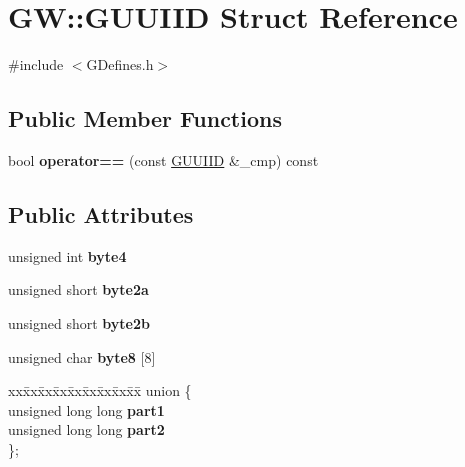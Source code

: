 \hypertarget{struct_g_w_1_1_g_u_u_i_i_d}{}\section{GW\+:\+:G\+U\+U\+I\+ID Struct Reference}
\label{struct_g_w_1_1_g_u_u_i_i_d}


{\ttfamily \#include $<$G\+Defines.\+h$>$}

\subsection*{Public Member Functions}
\begin{DoxyCompactItemize}
\item 
\hypertarget{struct_g_w_1_1_g_u_u_i_i_d_a91cfd5559e56d01dd58d0d60f1704bd6}{}\label{struct_g_w_1_1_g_u_u_i_i_d_a91cfd5559e56d01dd58d0d60f1704bd6} 
bool {\bfseries operator==} (const \hyperlink{struct_g_w_1_1_g_u_u_i_i_d}{G\+U\+U\+I\+ID} \&\+\_\+cmp) const
\end{DoxyCompactItemize}
\subsection*{Public Attributes}
\begin{DoxyCompactItemize}
\item 
\hypertarget{struct_g_w_1_1_g_u_u_i_i_d_a017e04c2cb5c5bab165bf4ec0fa3ca55}{}\label{struct_g_w_1_1_g_u_u_i_i_d_a017e04c2cb5c5bab165bf4ec0fa3ca55} 
unsigned int {\bfseries byte4}
\item 
\hypertarget{struct_g_w_1_1_g_u_u_i_i_d_a57b18450de3bffef5a6e39d9dcb6b68f}{}\label{struct_g_w_1_1_g_u_u_i_i_d_a57b18450de3bffef5a6e39d9dcb6b68f} 
unsigned short {\bfseries byte2a}
\item 
\hypertarget{struct_g_w_1_1_g_u_u_i_i_d_ab5045e59e0d3aa82a27208a063b9cbb6}{}\label{struct_g_w_1_1_g_u_u_i_i_d_ab5045e59e0d3aa82a27208a063b9cbb6} 
unsigned short {\bfseries byte2b}
\item 
\hypertarget{struct_g_w_1_1_g_u_u_i_i_d_a631f2e8efb3ddd9794c068e0b9000cce}{}\label{struct_g_w_1_1_g_u_u_i_i_d_a631f2e8efb3ddd9794c068e0b9000cce} 
unsigned char {\bfseries byte8} \mbox{[}8\mbox{]}
\item 
\hypertarget{struct_g_w_1_1_g_u_u_i_i_d_aa51f004bf72e52a4e15b7568b9a7ec50}{}\label{struct_g_w_1_1_g_u_u_i_i_d_aa51f004bf72e52a4e15b7568b9a7ec50} 
\begin{tabbing}
xx\=xx\=xx\=xx\=xx\=xx\=xx\=xx\=xx\=\kill
union \{\\
\>unsigned long long {\bfseries part1}\\
\>unsigned long long {\bfseries part2}\\
\}; \\

\end{tabbing}\end{DoxyCompactItemize}


